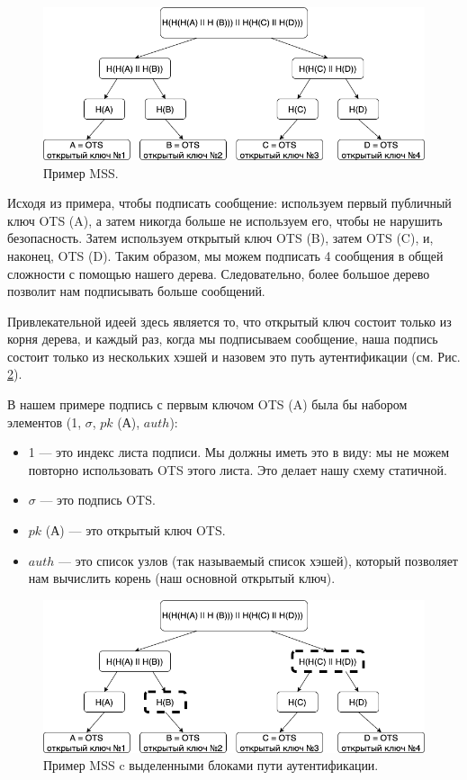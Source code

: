 \documentclass[a4paper, 14pt]{extarticle}
\begin{document}
\begin{figure}[h]
    \centering
    \includegraphics[scale=0.65]{MSS.png}
    \caption{Пример MSS.}
    \label{fig:MSS}
\end{figure}

Исходя из примера, чтобы подписать сообщение: используем первый публичный ключ OTS (A), а затем никогда больше не используем его, чтобы не нарушить безопасность. Затем используем открытый ключ OTS (B), затем OTS (C), и, наконец, OTS (D). Таким образом, мы можем подписать 4 сообщения в общей сложности с помощью нашего дерева. Следовательно, более большое дерево позволит нам подписывать больше сообщений.

Привлекательной идеей здесь является то, что открытый ключ состоит только из корня дерева, и каждый раз, когда мы подписываем сообщение, наша подпись состоит только из нескольких хэшей и назовем это путь аутентификации (см. Рис. \ref{fig:MSS_auth_path}).

В нашем примере подпись с первым ключом OTS (A) была бы набором элементов (1, $\sigma$, $pk$ (А), $auth$):

\begin{itemize}
    \item 1 --- это индекс листа подписи. Мы должны иметь это в виду: мы не можем повторно использовать OTS этого листа. Это делает нашу схему статичной.
    \item $\sigma$ --- это подпись OTS.
    \item $pk$ (А) --- это открытый ключ OTS.
    \item $auth$ --- это список узлов (так называемый список хэшей), который позволяет нам вычислить корень (наш основной открытый ключ).
\end{itemize}

\begin{figure}[h]
    \centering
    \includegraphics[scale=0.65]{MSS_auth_path.png}
    \caption{Пример MSS c выделенными блоками пути аутентификации.}
    \label{fig:MSS_auth_path}
\end{figure}
\end{document}
